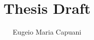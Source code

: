 \documentclass[a4paper,11pt]{article}
\begin{document}
\pagestyle{empty}
\title{Thesis Draft}
\author{Eugeio Maria Capuani}
\maketitle
\cleardoublepage

\cleardoublepage

\cleardoublepage
\thispagestyle{empty}
\printbibliography    
\end{document}
